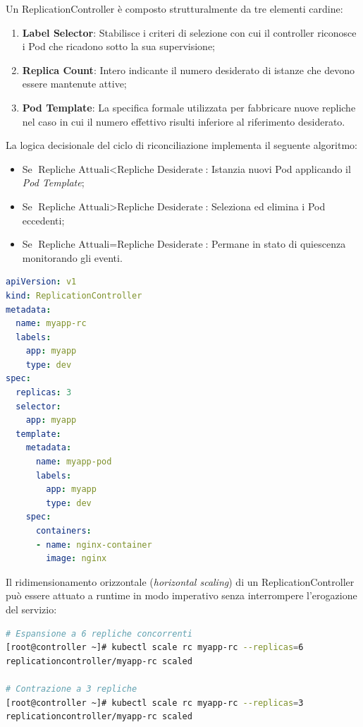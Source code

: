 \documentclass[11pt, a4paper]{article}
\begin{document}
Un ReplicationController è composto strutturalmente da tre elementi cardine:
\begin{enumerate}[noitemsep]
    \item \textbf{Label Selector}: Stabilisce i criteri di selezione con cui il controller riconosce i Pod che ricadono sotto la sua supervisione;
    \item \textbf{Replica Count}: Intero indicante il numero desiderato di istanze che devono essere mantenute attive;
    \item \textbf{Pod Template}: La specifica formale utilizzata per fabbricare nuove repliche nel caso in cui il numero effettivo risulti inferiore al riferimento desiderato.
\end{enumerate}


La logica decisionale del ciclo di riconciliazione implementa il seguente algoritmo:
\begin{itemize}[noitemsep]
    \item Se $\text{Repliche Attuali} < \text{Repliche Desiderate}$: Istanzia nuovi Pod applicando il \emph{Pod Template};
    \item Se $\text{Repliche Attuali} > \text{Repliche Desiderate}$: Seleziona ed elimina i Pod eccedenti;
    \item Se $\text{Repliche Attuali} = \text{Repliche Desiderate}$: Permane in stato di quiescenza monitorando gli eventi.
\end{itemize}

\begin{lstlisting}[language=yaml, caption={Dichiarazione classica di un \texttt{ReplicationController} (\texttt{replication-controller.yml}).}]
apiVersion: v1
kind: ReplicationController
metadata:
  name: myapp-rc
  labels:
    app: myapp
    type: dev
spec:
  replicas: 3
  selector:
    app: myapp
  template:
    metadata:
      name: myapp-pod
      labels:
        app: myapp
        type: dev
    spec:
      containers:
      - name: nginx-container
        image: nginx
\end{lstlisting}

Il ridimensionamento orizzontale (\emph{horizontal scaling}) di un ReplicationController può essere attuato a runtime in modo imperativo senza interrompere l'erogazione del servizio:
\begin{lstlisting}[language=bash]
# Espansione a 6 repliche concorrenti
[root@controller ~]# kubectl scale rc myapp-rc --replicas=6
replicationcontroller/myapp-rc scaled

# Contrazione a 3 repliche
[root@controller ~]# kubectl scale rc myapp-rc --replicas=3
replicationcontroller/myapp-rc scaled
\end{lstlisting}
\end{document}
